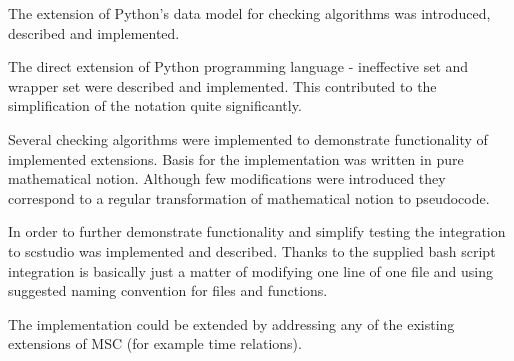 \documentclass[11pt,oneside]{fithesis2}
\begin{document}
The extension of Python's data model for checking algorithms was introduced, described and implemented.

The direct extension of Python programming language - ineffective set and wrapper set were described and implemented. This contributed to the simplification of the notation quite significantly.

Several checking algorithms were implemented to demonstrate functionality of implemented extensions. Basis for the implementation was written in pure mathematical notion. Although few modifications were introduced they correspond to a regular transformation of mathematical notion to pseudocode.

In order to further demonstrate functionality and simplify testing the integration to scstudio was implemented and described. Thanks to the supplied bash script integration is basically just a matter of modifying one line of one file and using suggested naming convention for files and functions.

The implementation could be extended by addressing any of the existing extensions of MSC (for example time relations).

\printbibliography
 
\end{document}

